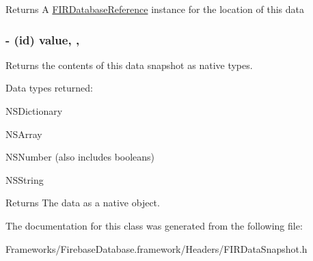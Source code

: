 \begin{DoxyReturn}{Returns}
A \hyperlink{interface_f_i_r_database_reference}{F\+I\+R\+Database\+Reference} instance for the location of this data 
\end{DoxyReturn}
\hypertarget{interface_f_i_r_data_snapshot_abd618080bd1b6cc92bf842ef685f2917}{}
\subsubsection[{value}]{\setlength{\rightskip}{0pt plus 5cm}-\/ (id) value\hspace{0.3cm}{\ttfamily [read]}, {\ttfamily [nonatomic]}, {\ttfamily [strong]}}\label{interface_f_i_r_data_snapshot_abd618080bd1b6cc92bf842ef685f2917}
Returns the contents of this data snapshot as native types.

Data types returned\+:
\begin{DoxyItemize}
\item N\+S\+Dictionary
\item N\+S\+Array
\item N\+S\+Number (also includes booleans)
\item N\+S\+String
\end{DoxyItemize}

\begin{DoxyReturn}{Returns}
The data as a native object. 
\end{DoxyReturn}


The documentation for this class was generated from the following file\+:\begin{DoxyCompactItemize}
\item 
Frameworks/\+Firebase\+Database.\+framework/\+Headers/F\+I\+R\+Data\+Snapshot.\+h\end{DoxyCompactItemize}
